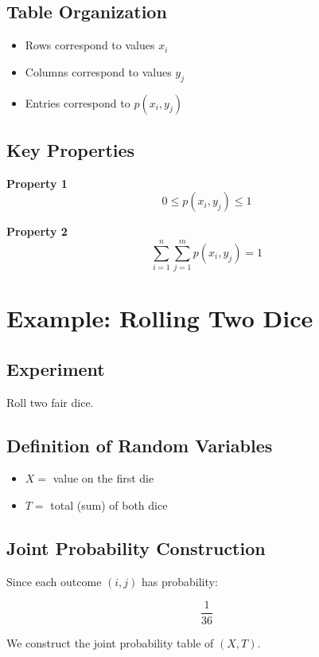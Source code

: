 \documentclass[12pt]{article}
\begin{document}
\subsection{Table Organization}

\begin{itemize}
\item Rows correspond to values $x_i$
\item Columns correspond to values $y_j$
\item Entries correspond to $p(x_i, y_j)$
\end{itemize}

\subsection{Key Properties}

\textbf{Property 1}
\[
0 \le p(x_i, y_j) \le 1
\]

\textbf{Property 2}
\[
\sum_{i=1}^{n} \sum_{j=1}^{m} p(x_i, y_j) = 1
\]

\section{Example: Rolling Two Dice}

\subsection{Experiment}

Roll two fair dice.

\subsection{Definition of Random Variables}

\begin{itemize}
\item $X =$ value on the first die
\item $T =$ total (sum) of both dice
\end{itemize}

\subsection{Joint Probability Construction}

Since each outcome $(i,j)$ has probability:

\[
\frac{1}{36}
\]

We construct the joint probability table of $(X,T)$.
\end{document}
